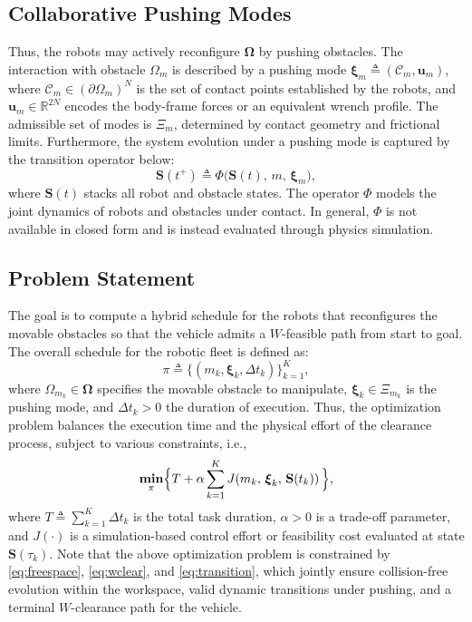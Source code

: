 \subsection{Collaborative Pushing Modes}\label{ss:interaction_mode}
Thus, the robots may actively reconfigure $\boldsymbol{\Omega}$ by pushing obstacles.
The interaction with obstacle $\Omega_m$ is described by a pushing mode
$\boldsymbol{\xi}_m\triangleq(\mathcal{C}_m,\mathbf{u}_m)$,
where $\mathcal{C}_m\in(\partial\Omega_m)^N$ is the set of contact points
established by the robots, and $\mathbf{u}_m\in\mathbb{R}^{2N}$ encodes the body-frame forces
or an equivalent wrench profile. The admissible set of
modes is $\Xi_m$, determined by contact geometry and frictional limits.
Furthermore, the system evolution under a pushing mode
is captured by the transition operator below:
\begin{equation}\label{eq:transition}
  \mathbf{S}(t^+)\triangleq\Phi\big(\mathbf{S}(t),\,m,\,\boldsymbol{\xi}_m\big),
\end{equation}
where $\mathbf{S}(t)$ stacks all robot and obstacle states. The operator
$\Phi$ models the joint dynamics of robots and obstacles under contact. In
general, $\Phi$ is not available in closed form and is instead evaluated
through physics simulation.



\subsection{Problem Statement}\label{subsec:objective}
The goal is to compute a hybrid schedule for the robots that reconfigures the movable
obstacles so that the vehicle admits a $W$-feasible path from start to goal.
The overall schedule for the robotic fleet is defined as:
\begin{equation}\label{eq:schedule}
\pi\triangleq\big\{(m_k,\boldsymbol{\xi}_k,\Delta t_k)\big\}_{k=1}^{K},
\end{equation}
where $\Omega_{m_k}\in \boldsymbol{\Omega}$ specifies the movable obstacle to manipulate,
$\boldsymbol{\xi}_k\in\Xi_{m_k}$ is the pushing mode, and
$\Delta t_k>0$ the duration of execution.
Thus, the optimization problem balances the execution time and the physical effort
of the clearance process, subject to various constraints, i.e.,
\begin{equation}\label{eq:problem}
\underset{\pi}{\textbf{min}} \Big{\{} T+\alpha\sum_{k=1}^{K}
J\!\left(m_k,\,\boldsymbol{\xi}_k,\,\mathbf{S}(t_k)\right)\Big{\}},
\end{equation}
where $T\triangleq\sum_{k=1}^{K}\Delta t_k$ is the total task duration,
$\alpha>0$ is a trade-off parameter, and $J(\cdot)$ is a simulation-based
control effort or feasibility cost evaluated at state $\mathbf{S}(\tau_k)$.
Note that the above optimization
problem is constrained by \eqref{eq:freespace}, \eqref{eq:wclear}, and
\eqref{eq:transition}, which jointly ensure collision-free evolution within
the workspace, valid dynamic transitions under pushing, and a terminal
$W$-clearance path for the vehicle.


